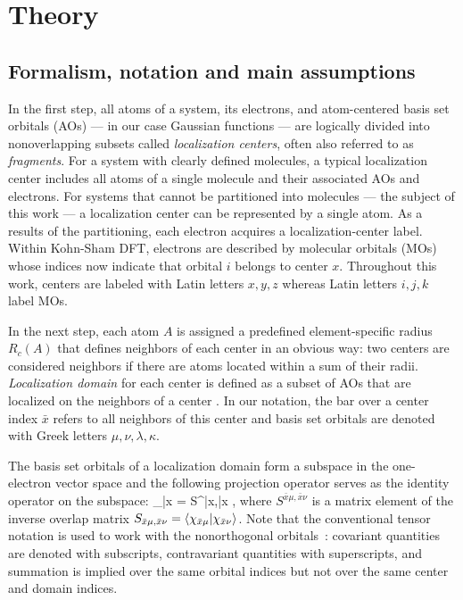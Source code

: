 \documentclass[aps,prl,twocolumn,reprint,amsmath,amssymb]{revtex4-1}
\begin{document}
\section{Theory} 

\subsection{Formalism, notation and main assumptions}
 
In the first step, all atoms of a system, its electrons, and atom-centered basis set orbitals (AOs) --- in our case Gaussian functions --- are logically divided into nonoverlapping subsets called \emph{localization centers}, often also referred to as \emph{fragments}. 
For a system with clearly defined molecules, a typical localization center includes all atoms of a single molecule and their associated AOs and electrons. 
For systems that cannot be partitioned into molecules --- the subject of this work --- a localization center can be represented by a single atom. 
As a results of the partitioning, each electron acquires a localization-center label. 
Within Kohn-Sham DFT, electrons are described by molecular orbitals (MOs)  whose indices now indicate that orbital $i$ belongs to center $x$. Throughout this work, centers are labeled with Latin letters $x,y,z$ whereas Latin letters $i,j,k$ label MOs. 

In the next step, each atom $A$ is assigned a predefined element-specific radius $R_c(A)$ that defines neighbors of each center in an obvious way: two centers are considered neighbors if there are atoms located within a sum of their radii. 
\emph{Localization domain} for each center is defined as a subset of AOs that are localized on the neighbors of a center . In our notation, the bar over a center index $\bar{x}$ refers to all neighbors of this center and basis set orbitals are denoted with Greek letters $\mu,\nu,\lambda, \kappa$. 

The basis set orbitals of a localization domain form a subspace in the one-electron vector space and the following projection operator serves as the identity operator on the subspace:
%
\bea
{}_{\bar{x}} =  S^{\bar{x}\mu,\bar{x}\nu} ,
\eea
%
where $S^{\bar{x}\mu,\bar{x}\nu}$ is a matrix element of the inverse overlap matrix $S_{\bar{x}\mu,\bar{x}\nu} = \langle  \chi_{\bar{x}\mu} \vert  \chi_{\bar{x}\nu} \rangle $. Note that the conventional tensor notation is used to work with the nonorthogonal orbitals~\cite{head1998tensor}: covariant quantities are denoted with subscripts, contravariant quantities with superscripts, and summation is implied over the same orbital indices but not over the same center and domain indices.
\end{document}
